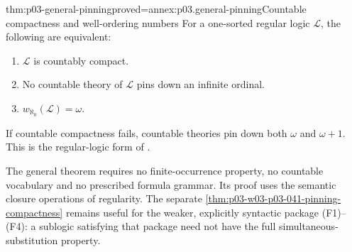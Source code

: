 \begin{hbtheorem}{thm:p03-general-pinning}{proved=annex:p03.general-pinning}{Countable compactness and well-ordering numbers}
For a one-sorted regular logic \(\mathscr L\), the following are equivalent:
\begin{enumerate}
 \item \(\mathscr L\) is countably compact.
 \item No countable theory of \(\mathscr L\) pins down an infinite ordinal.
 \item \(w_{\aleph_0}(\mathscr L)=\omega\).
\end{enumerate}
If countable compactness fails, countable theories pin down both
\(\omega\) and \(\omega+1\).
This is the regular-logic form of
\cite[Ch.~II, Proposition~5.2.4, p.~62]{Ebbinghaus1985ExtendedLogics}.
\end{hbtheorem}

The general theorem requires no finite-occurrence property, no countable
vocabulary and no prescribed formula grammar. Its proof uses the semantic
closure operations of regularity. The separate
\cref{thm:p03-w03-p03-041-pinning-compactness} remains useful for the
weaker, explicitly syntactic package (F1)--(F4): a sublogic satisfying
that package need not have the full simultaneous-substitution property.
